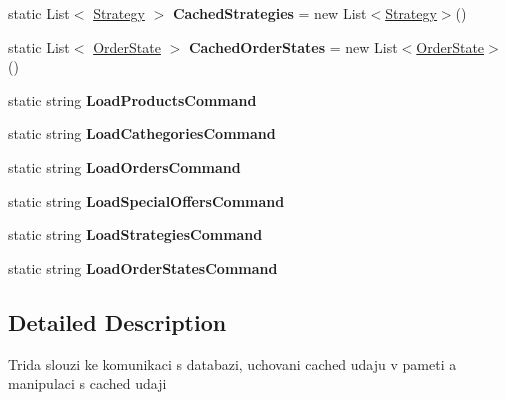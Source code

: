 \begin{DoxyCompactItemize}
\item 
\mbox{\label{class_eshop_1_1_database_ab7a409168315eb14931324316e982366}} 
static List$<$ \mbox{\hyperlink{class_eshop_1_1_database_entites_1_1_strategy}{Strategy}} $>$ {\bfseries Cached\+Strategies} = new List$<$\mbox{\hyperlink{class_eshop_1_1_database_entites_1_1_strategy}{Strategy}}$>$()
\item 
\mbox{\label{class_eshop_1_1_database_a863e45584a10c9cddd877a2d3d076388}} 
static List$<$ \mbox{\hyperlink{class_eshop_1_1_database_entites_1_1_order_state}{Order\+State}} $>$ {\bfseries Cached\+Order\+States} = new List$<$\mbox{\hyperlink{class_eshop_1_1_database_entites_1_1_order_state}{Order\+State}}$>$()
\item 
static string {\bfseries Load\+Products\+Command}
\item 
static string {\bfseries Load\+Cathegories\+Command}
\item 
static string {\bfseries Load\+Orders\+Command}
\item 
static string {\bfseries Load\+Special\+Offers\+Command}
\item 
static string {\bfseries Load\+Strategies\+Command}
\item 
static string {\bfseries Load\+Order\+States\+Command}
\end{DoxyCompactItemize}


\subsection{Detailed Description}
Trida slouzi ke komunikaci s databazi, uchovani cached udaju v pameti a manipulaci s cached udaji 



